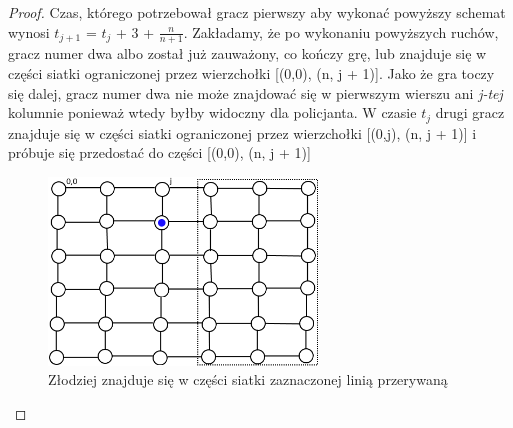 \documentclass[brudnopis]{xmgr}
\begin{document}
\begin{proof}
	Czas, którego potrzebował gracz pierwszy aby wykonać powyższy schemat wynosi $t_{j+1}$ = $t_j$ + 3 + $\frac{n}{n+1}$.
	Zakładamy, że po wykonaniu powyższych ruchów, gracz numer dwa albo został już zauważony, co kończy grę, lub znajduje się w części siatki ograniczonej przez wierzchołki [(0,0), (n, j + 1)].
	\indent Jako że gra toczy się dalej, gracz numer dwa nie może znajdować się w pierwszym wierszu ani \textit{j-tej} kolumnie ponieważ wtedy byłby widoczny dla policjanta. W czasie \textit{$t_j$} drugi gracz znajduje się w części siatki ograniczonej przez wierzchołki [(0,j), (n, j + 1)] i próbuje się przedostać do części [(0,0), (n, j + 1)]

	\begin{figure}[ht!]
	  \centering
	  \includegraphics[height=5cm]{rysunki/podsiatka.png}
	  \caption{Złodziej znajduje się w części siatki zaznaczonej linią przerywaną}
	\end{figure} 


\end{proof}
\end{document}
